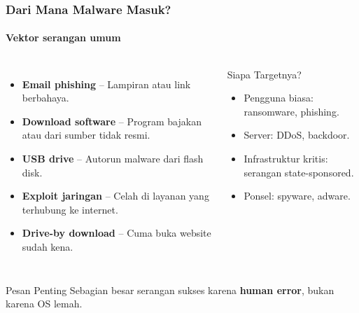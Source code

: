 \documentclass[t,aspectratio=169,xcolor=dvipsnames]{beamer}
\begin{document}
\begin{frame}
    \frametitle{Dari Mana Malware Masuk?}
    \framesubtitle{Vektor serangan umum}

    \begin{columns}[T]
        \footnotesize
        \begin{itemize}
            \item \textbf{Email phishing} -- Lampiran atau link berbahaya.
            \item \textbf{Download software} -- Program bajakan atau dari sumber tidak resmi.
            \item \textbf{USB drive} -- Autorun malware dari flash disk.
            \item \textbf{Exploit jaringan} -- Celah di layanan yang terhubung ke internet.
            \item \textbf{Drive-by download} -- Cuma buka website sudah kena.
        \end{itemize}

        \begin{block}{Siapa Targetnya?}
            \footnotesize
            \begin{itemize}
                \item Pengguna biasa: ransomware, phishing.
                \item Server: DDoS, backdoor.
                \item Infrastruktur kritis: serangan state-sponsored.
                \item Ponsel: spyware, adware.
            \end{itemize}
        \end{block}
    \end{columns}

    \vspace{0.15cm}
    \begin{exampleblock}{Pesan Penting}
        \footnotesize
        Sebagian besar serangan sukses karena \textbf{human error}, bukan karena OS lemah.
    \end{exampleblock}
\end{frame}
\end{document}
